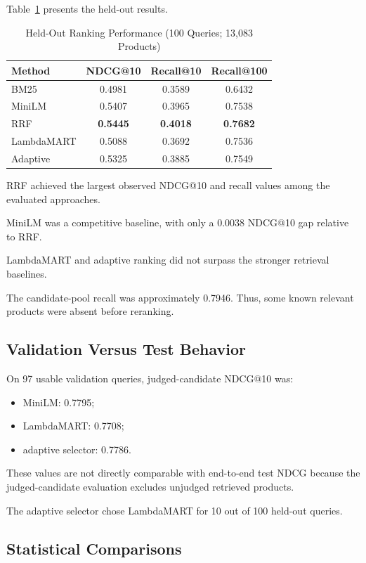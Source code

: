 \documentclass[conference]{IEEEtran}
\begin{document}
Table~\ref{tab:main} presents the
held-out results.

\begin{table}[t]
\centering
\caption{Held-Out Ranking Performance
(100 Queries; 13,083 Products)}
\label{tab:main}
\footnotesize
\setlength{\tabcolsep}{3.0pt}
\begin{tabular}{lccc}
\toprule
Method &
NDCG@10 &
Recall@10 &
Recall@100 \\
\midrule
BM25 & 0.4981 & 0.3589 & 0.6432\\
MiniLM & 0.5407 & 0.3965 & 0.7538\\
RRF & \textbf{0.5445} &
\textbf{0.4018} &
\textbf{0.7682}\\
LambdaMART & 0.5088 & 0.3692 & 0.7536\\
Adaptive & 0.5325 & 0.3885 & 0.7549\\
\bottomrule
\end{tabular}
\end{table}

RRF achieved the largest observed
NDCG@10 and recall values among
the evaluated approaches.

MiniLM was a competitive baseline,
with only a 0.0038 NDCG@10 gap
relative to RRF.

LambdaMART and adaptive ranking
did not surpass the stronger
retrieval baselines.

The candidate-pool recall was
approximately 0.7946. Thus,
some known relevant products
were absent before reranking.

\subsection{Validation Versus Test Behavior}

On 97 usable validation queries,
judged-candidate NDCG@10 was:

\begin{itemize}
\item MiniLM: 0.7795;
\item LambdaMART: 0.7708;
\item adaptive selector: 0.7786.
\end{itemize}

These values are not directly
comparable with end-to-end test
NDCG because the judged-candidate
evaluation excludes unjudged
retrieved products.

The adaptive selector chose
LambdaMART for 10 out of
100 held-out queries.

\subsection{Statistical Comparisons}
\end{document}
